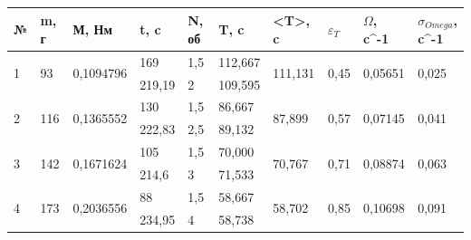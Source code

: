 \begin{table}[H]
\centering
\begin{tabular}{|l|l|l|l|l|l|l|l|l|l|}
\hline
№                  & m, г                 & М, Нм                      & t, c   & N, об & T, c    & \textless{}T\textgreater{}, c & $\varepsilon_T$          & $\Omega$, c^-1 & $\sigma_{Omega}$, c^-1 \\ \hline
\multirow{2}{*}{1} & \multirow{2}{*}{93}  & \multirow{2}{*}{0,1094796} & 169    & 1,5   & 112,667 & \multirow{2}{*}{111,131}      & \multirow{2}{*}{0,45} & \multirow{2}{*}{0,05651}     & \multirow{2}{*}{0,025}            \\ \cline{4-6}
                   &                      &                            & 219,19 & 2     & 109,595 &                               &                       &                              &                                   \\ \hline\hline
\multirow{2}{*}{2} & \multirow{2}{*}{116} & \multirow{2}{*}{0,1365552} & 130    & 1,5   & 86,667  & \multirow{2}{*}{87,899}       & \multirow{2}{*}{0,57} & \multirow{2}{*}{0,07145}     & \multirow{2}{*}{0,041}            \\ \cline{4-6}
                   &                      &                            & 222,83 & 2,5   & 89,132  &                               &                       &                              &                                   \\ \hline\hline
\multirow{2}{*}{3} & \multirow{2}{*}{142} & \multirow{2}{*}{0,1671624} & 105    & 1,5   & 70,000  & \multirow{2}{*}{70,767}       & \multirow{2}{*}{0,71} & \multirow{2}{*}{0,08874}     & \multirow{2}{*}{0,063}            \\ \cline{4-6}
                   &                      &                            & 214,6  & 3     & 71,533  &                               &                       &                              &                                   \\ \hline\hline
\multirow{2}{*}{4} & \multirow{2}{*}{173} & \multirow{2}{*}{0,2036556} & 88     & 1,5   & 58,667  & \multirow{2}{*}{58,702}       & \multirow{2}{*}{0,85} & \multirow{2}{*}{0,10698}     & \multirow{2}{*}{0,091}            \\ \cline{4-6}
                   &                      &                            & 234,95 & 4     & 58,738  &                               &                       &                              &                                   \\ \hline\hline

\end{tabular}
\end{table}

